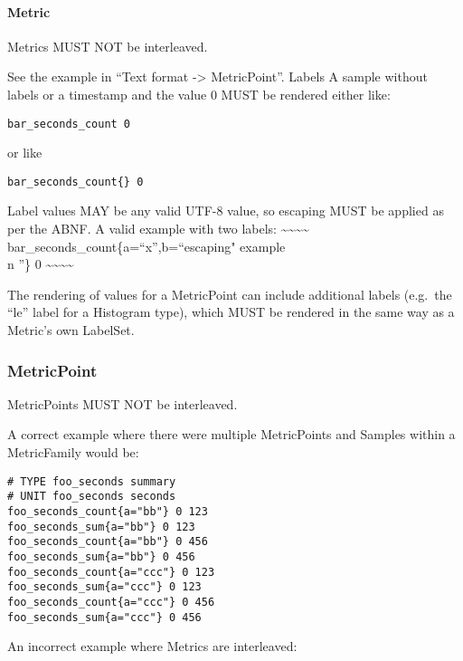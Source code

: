 \documentclass[a4paper,12pt,notitlepage,twoside,openright]{article}
\begin{document}
\hypertarget{metric-1}{%
\paragraph{Metric}\label{metric-1}}

Metrics MUST NOT be interleaved.

See the example in ``Text format -\textgreater{} MetricPoint''. Labels A
sample without labels or a timestamp and the value 0 MUST be rendered
either like:

\begin{verbatim}
bar_seconds_count 0
\end{verbatim}

or like

\begin{verbatim}
bar_seconds_count{} 0
\end{verbatim}

Label values MAY be any valid UTF-8 value, so escaping MUST be applied
as per the ABNF. A valid example with two labels:
\textasciitilde\textasciitilde\textasciitilde\textasciitilde{}
bar\_seconds\_count\{a=``x'',b=``escaping" example \\n ''\} 0
\textasciitilde\textasciitilde\textasciitilde\textasciitilde{}

The rendering of values for a MetricPoint can include additional labels
(e.g.~the ``le'' label for a Histogram type), which MUST be rendered in
the same way as a Metric's own LabelSet.

\hypertarget{metricpoint-1}{%
\subsubsection{MetricPoint}\label{metricpoint-1}}

MetricPoints MUST NOT be interleaved.

A correct example where there were multiple MetricPoints and Samples
within a MetricFamily would be:

\begin{verbatim}
# TYPE foo_seconds summary
# UNIT foo_seconds seconds
foo_seconds_count{a="bb"} 0 123
foo_seconds_sum{a="bb"} 0 123
foo_seconds_count{a="bb"} 0 456
foo_seconds_sum{a="bb"} 0 456
foo_seconds_count{a="ccc"} 0 123
foo_seconds_sum{a="ccc"} 0 123
foo_seconds_count{a="ccc"} 0 456
foo_seconds_sum{a="ccc"} 0 456
\end{verbatim}

An incorrect example where Metrics are interleaved:
\end{document}
